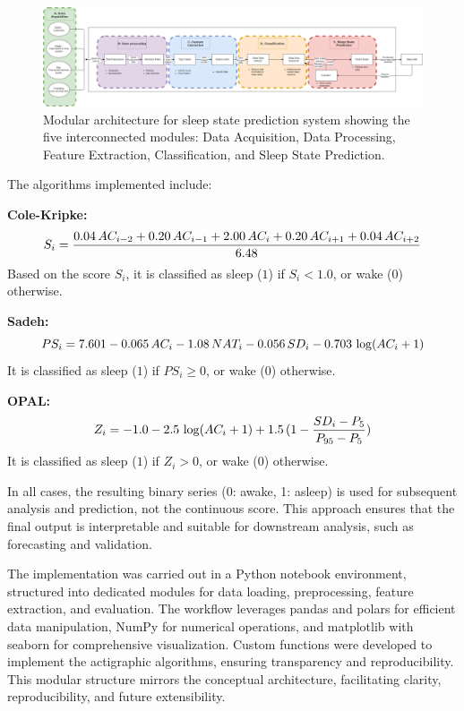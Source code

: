 \documentclass[conference]{IEEEtran}
\begin{document}
\begin{figure}[htbp]
	\centering
	\includegraphics[width=\columnwidth]{system_architecture.png}
	\caption{Modular architecture for sleep state prediction system showing the five interconnected modules: Data Acquisition, Data Processing, Feature Extraction, Classification, and Sleep State Prediction.}
	\label{fig:architecture}
\end{figure}

The algorithms implemented include:

\textbf{Cole-Kripke:}
\begin{equation}
	\scriptsize
	S_i = \frac{0.04\,AC_{i-2} + 0.20\,AC_{i-1} + 2.00\,AC_i + 0.20\,AC_{i+1} + 0.04\,AC_{i+2}}{6.48}
\end{equation}
Based on the score $S_i$, it is classified as sleep ($1$) if $S_i < 1.0$, or wake ($0$) otherwise.


\textbf{Sadeh:}
\begin{equation}
	\scriptsize
	PS_i = 7.601 - 0.065\,AC_i - 1.08\,NAT_i - 0.056\,SD_i - 0.703\,\log(AC_i + 1)
\end{equation}
It is classified as sleep ($1$) if $PS_i \geq 0$, or wake ($0$) otherwise.

\textbf{OPAL:}
\begin{equation}
	\scriptsize
	Z_i = -1.0 - 2.5\,\log(AC_i + 1) + 1.5\,(1 - \frac{SD_i - P_5}{P_{95} - P_5})
\end{equation}
It is classified as sleep ($1$) if $Z_i > 0$, or wake ($0$) otherwise.

In all cases, the resulting binary series (0: awake, 1: asleep) is used for subsequent analysis and prediction, not the continuous score. This approach ensures that the final output is interpretable and suitable for downstream analysis, such as forecasting and validation.

The implementation was carried out in a Python notebook environment, structured into dedicated modules for data loading, preprocessing, feature extraction, and evaluation. The workflow leverages pandas and polars for efficient data manipulation, NumPy for numerical operations, and matplotlib with seaborn for comprehensive visualization. Custom functions were developed to implement the actigraphic algorithms, ensuring transparency and reproducibility. This modular structure mirrors the conceptual architecture, facilitating clarity, reproducibility, and future extensibility.
\end{document}
